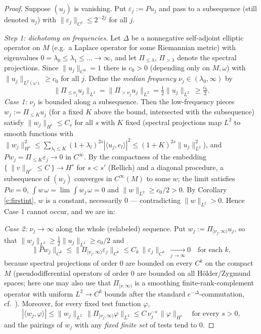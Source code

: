 \documentclass[11pt]{amsart}
\theoremstyle{plain}
\theoremstyle{definition}
\theoremstyle{remark}
\begin{document}
\begin{proof}
Suppose $(u_j)$ is vanishing.  Put $\varepsilon_j:=Pu_j$ and pass to
a subsequence (still denoted $u_j$) with
$\|\varepsilon_j\|_{C^{j}}\le 2^{-2j}$ for all $j$.

\emph{Step 1: dichotomy on frequencies.}  Let $\Delta$ be a
nonnegative self-adjoint elliptic operator on $M$ (e.g.\ a Laplace
operator for some Riemannian metric) with eigenvalues
$0=\lambda_0\le \lambda_1\le\dots\to\infty$, and let
$\Pi_{\le\lambda}$, $\Pi_{>\lambda}$ denote the spectral
projections.  Since $\|u_j\|_{C^0}=1$ there is $c_0>0$ (depending
only on $M,\omega$) with $\|u_j\|_{L^2(\omega)}\ge c_0$ for all $j$.
Define the \emph{median frequency} $\nu_j\in(\lambda_0,\infty)$ by
\[
\|\Pi_{\le\nu_j}u_j\|_{L^2}=\|\Pi_{>\nu_j}u_j\|_{L^2}
=\tfrac12\|u_j\|_{L^2}\ \ge \tfrac{c_0}{2}.
\]
\emph{Case 1:} $\nu_j$ is bounded along a subsequence.  Then the
low-frequency pieces $w_j:=\Pi_{\le K}u_j$ (for a fixed $K$ above the
bound, intersected with the subsequence) satisfy
$\|w_j\|_{H^{s}}\le C_s$ for all $s$ with $K$ fixed (spectral
projections map $L^2$ to smooth functions with
$\|w_j\|_{H^{s}}^2\le \sum_{\lambda_l\le K}(1+\lambda_l)^{2s}
|\langle u_j,e_l\rangle|^2\le (1+K)^{2s}\|u_j\|_{L^2}^2$), and
$Pw_j=\Pi_{\le K}\varepsilon_j\to 0$ in $C^\infty$.  By the
compactness of the embedding $\{ \ \|v\|_{H^{s'}}\le C\ \}\to H^{s}$
for $s<s'$ (Rellich) and a diagonal procedure, a subsequence of
$(w_j)$ converges in $C^\infty(M)$ to some $w$; the limit satisfies
$Pw=0$, $\int w\,\omega=\lim\int w_j\,\omega=0$ and
$\|w\|_{L^2}\ge c_0/2>0$.  By Corollary \ref{c:firstint}, $w$ is a
constant, necessarily $0$ --- contradicting $\|w\|_{L^2}>0$.
Hence Case 1 cannot occur, and we are in:

\emph{Case 2:} $\nu_j\to\infty$ along the whole (relabeled)
sequence.  Put $w_j:=\Pi_{[\nu_j,\infty)}u_j$, so that
$\|w_j\|_{L^2}\ge \tfrac12\|u_j\|_{L^2}\ge c_0/2$ and
\[
\|P w_j\|_{C^{k}}
\le \|\Pi_{[\nu_j,\infty)}\varepsilon_j\|_{C^{k}}
\le C_k\,\|\varepsilon_j\|_{C^{k}}\ \xrightarrow[j\to\infty]{}0
\quad\text{for each }k,
\]
because spectral projections of order $0$ are bounded on every
$C^{k}$ on the compact $M$ (pseudodifferential operators of order
$0$ are bounded on all Hölder/Zygmund spaces; here one may also use
that $\Pi_{[\nu,\infty)}$ is a smoothing finite-rank-complement
operator with uniform $L^2\to C^k$ bounds after the standard
$e^{-\Delta}$-commutation, cf.\ \cite[Th.~8.1]{TaylorPDE}).
Moreover, for every fixed test function $\varphi$,
\begin{equation}\label{eq:pairdecay}
|\langle w_j,\varphi\rangle|
\le \|w_j\|_{L^2}\,\|\Pi_{[\nu_j,\infty)}\varphi\|_{L^2}
\le C\,\nu_j^{-s}\,\|\varphi\|_{H^{s}}
\quad\text{for every } s>0,
\end{equation}
and the pairings of $w_j$ with any \emph{fixed finite set} of tests
tend to $0$.


\end{proof}
\end{document}
